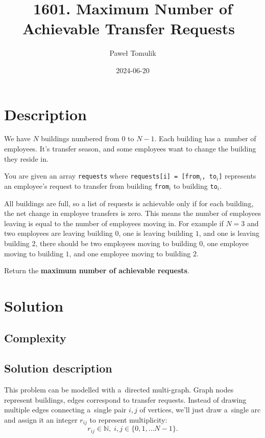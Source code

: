 \documentclass[paper=a4,parskip=half,DIV=12]{leetcode}
\begin{document}
\title{1601. Maximum Number of Achievable Transfer Requests~\cite{leetcode:1601}}
\subtitle{}
\author{Paweł Tomulik}
\date{2024-06-20}
\maketitle

\section{Description}
\label{sec:description}

We have $N$ buildings numbered from $0$ to $N - 1$. Each building has a~number
of employees. It's transfer season, and some employees want to change the
building they reside in.

You are given an array \texttt{requests} where \texttt{requests[i] = [from$_i$,
to$_i$]} represents an employee's request to transfer from building
\texttt{from$_i$} to building \texttt{to$_i$}.

All buildings are full, so a list of requests is achievable only if for each
building, the net change in employee transfers is zero. This means the number
of employees leaving is equal to the number of employees moving in. For example
if $N = 3$ and two employees are leaving building $0$, one is leaving building
$1$, and one is leaving building $2$, there should be two employees moving to
building $0$, one employee moving to building $1$, and one employee moving to
building $2$.

Return the \textbf{maximum number of achievable requests}.

\section{Solution}
\label{sec:solution}

\subsection{Complexity}
\label{sec:complexity}

\subsection{Solution description}
\label{sec:solution-description}

This problem can be modelled with a~directed multi-graph. Graph nodes represent
buildings, edges correspond to transfer requests. Instead of drawing multiple
edges connecting a~single pair $i,j$ of vertices, we'll just draw a~single arc
and assign it an integer $r_{ij}$ to represent multiplicity:
\begin{equation}
    r_{ij} \in \mathbb{N}, \; i, j \in \{ 0, 1, \dots N-1 \}.
    \label{eq:49EZ8}
\end{equation}
\end{document}
